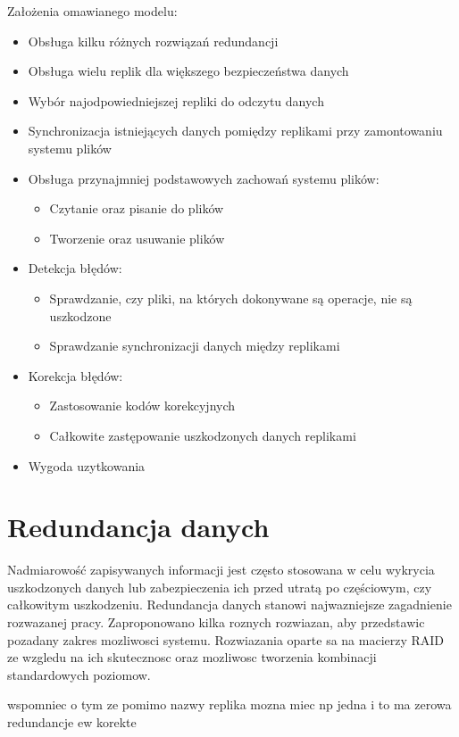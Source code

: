 Założenia omawianego modelu:
\begin{itemize}
    \item Obsługa kilku różnych rozwiązań redundancji
    \item Obsługa wielu replik dla większego bezpieczeństwa danych 
    \item Wybór najodpowiedniejszej repliki do odczytu danych
    \item Synchronizacja istniejących danych pomiędzy replikami przy zamontowaniu systemu plików
	\item Obsługa przynajmniej podstawowych zachowań systemu plików:
		\begin{itemize}
			\item Czytanie oraz pisanie do plików
			\item Tworzenie oraz usuwanie plików
		\end{itemize}
	\item Detekcja błędów:
		\begin{itemize}
			\item Sprawdzanie, czy pliki, na których dokonywane są operacje, nie są uszkodzone
			\item Sprawdzanie synchronizacji danych między replikami
		\end{itemize}
	\item Korekcja błędów:
		\begin{itemize}
			\item Zastosowanie kodów korekcyjnych
			\item Całkowite zastępowanie uszkodzonych danych replikami
		\end{itemize}
    \item Wygoda uzytkowania
\end{itemize}

\section {Redundancja danych}
Nadmiarowość zapisywanych informacji jest często stosowana w celu wykrycia uszkodzonych danych lub zabezpieczenia ich przed utratą po częściowym, czy całkowitym uszkodzeniu.
Redundancja danych stanowi najwazniejsze zagadnienie rozwazanej pracy. Zaproponowano kilka roznych rozwiazan, aby przedstawic pozadany zakres mozliwosci systemu. Rozwiazania oparte sa na macierzy RAID ze wzgledu na ich skutecznosc oraz mozliwosc tworzenia kombinacji standardowych poziomow.

wspomniec o tym ze pomimo nazwy replika mozna miec np jedna i to ma zerowa redundancje ew korekte
